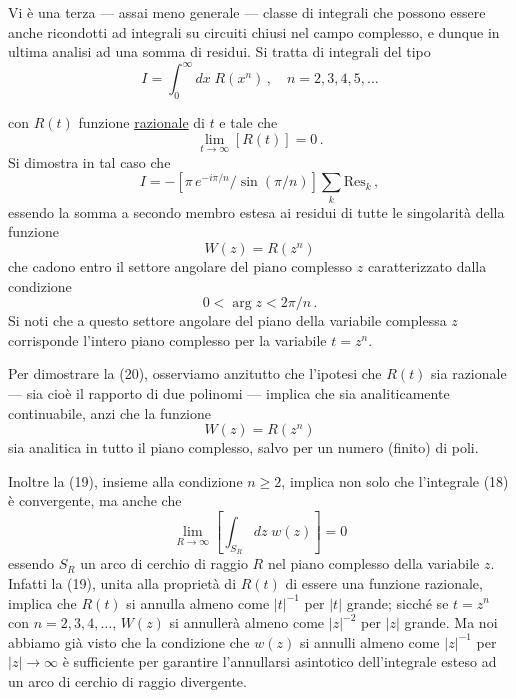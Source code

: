 \documentclass[11pt, a4paper]{book}
\numberwithin{equation}{section}
\begin{document}
Vi è una terza — assai meno generale — classe di integrali che possono essere anche ricondotti ad integrali su circuiti chiusi nel campo complesso, e dunque in ultima analisi ad una somma di residui. Si tratta di integrali del tipo
\begin{equation}
I = \int_0^{\infty} dx\; R(x^n)\,, \quad n = 2, 3, 4, 5, \ldots \tag{18}
\end{equation}

con $R(t)$ funzione \uline{razionale} di $t$ e tale che
\begin{equation}
\lim_{t \to \infty} \left[R(t)\right] = 0\,. \tag{19}
\end{equation}
Si dimostra in tal caso che
\begin{equation}
I = -\left[\pi\,e^{-i\pi/n} \big/ \sin(\pi/n)\right] \sum_k \mathrm{Res}_k\,, \tag{20}
\end{equation}
essendo la somma a secondo membro estesa ai residui di tutte le singolarità della funzione
\begin{equation}
W(z) = R(z^n) \tag{21}
\end{equation}
che cadono entro il settore angolare del piano complesso $z$ caratterizzato dalla condizione
\begin{equation}
0 < \arg z < 2\pi/n\,. \tag{22}
\end{equation}
Si noti che a questo settore angolare del piano della variabile complessa $z$ corrisponde l'intero piano complesso per la variabile $t = z^n$.

Per dimostrare la (20), osserviamo anzitutto che l'ipotesi che $R(t)$ sia razionale — sia cioè il rapporto di due polinomi — implica che sia analiticamente continuabile, anzi che la funzione
\[
W(z) = R(z^n)
\]
sia analitica in tutto il piano complesso, salvo per un numero (finito) di poli.

Inoltre la (19), insieme alla condizione $n \geq 2$, implica non solo che l'integrale (18) è convergente, ma anche che
\[
\lim_{R \to \infty} \left[\int_{S_R} dz\; w(z)\right] = 0
\]
essendo $S_R$ un arco di cerchio di raggio $R$ nel piano complesso della variabile $z$. Infatti la (19), unita alla proprietà di $R(t)$ di essere una funzione razionale, implica che $R(t)$ si annulla almeno come $|t|^{-1}$ per $|t|$ grande; sicché se $t = z^n$ con $n = 2, 3, 4, \ldots$, $W(z)$ si annullerà almeno come $|z|^{-2}$ per $|z|$ grande. Ma noi abbiamo già visto che la condizione che $w(z)$ si annulli almeno come $|z|^{-1}$ per $|z| \to \infty$ è sufficiente per garantire l'annullarsi asintotico dell'integrale esteso ad un arco di cerchio di raggio divergente.
\end{document}
